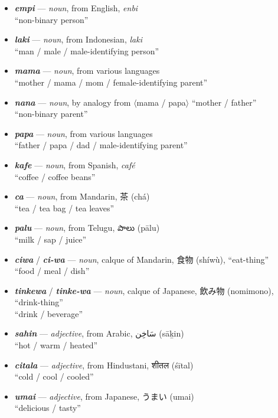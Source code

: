 \documentclass[a4paper]{article}
\begin{document}
\begin{itemize}
	\item \textbf{\textit{empi}} — \textit{noun}, from English, \textit{enbi} \\``non-binary person''
	\item \textbf{\textit{laki}} — \textit{noun}, from Indonesian, \textit{laki} \\``man / male / male-identifying person''
	\item \textbf{\textit{mama}} — \textit{noun}, from various languages \\``mother / mama / mom / female-identifying parent''
	\item \textbf{\textit{nana}} — \textit{noun}, by analogy from $\langle$mama / papa$\rangle$ ``mother / father'' \\``non-binary parent''
	\item \textbf{\textit{papa}} — \textit{noun}, from various languages \\``father / papa / dad / male-identifying parent''
	\item \textbf{\textit{kafe}} — \textit{noun}, from Spanish, \textit{café} \\``coffee / coffee beans''
	\item \textbf{\textit{ca}} — \textit{noun}, from Mandarin, 茶 (chá) \\``tea / tea bag / tea leaves''
	\item \textbf{\textit{palu}} — \textit{noun}, from Telugu, {\tlgfont పాలు} (pālu) \\``milk / sap / juice''
	\item \textbf{\textit{ciwa}} / \textbf{\textit{ci-wa}} — \textit{noun}, calque of Mandarin, 食物 (shíwù), ``eat-thing'' \\``food / meal / dish''
	\item \textbf{\textit{tinkewa}}  / \textbf{\textit{tinke-wa}} — \textit{noun}, calque of Japanese, 飲み物 (nomimono), ``drink-thing'' \\``drink / beverage''
	\item \textbf{\textit{sahin}} — \textit{adjective}, from Arabic, {\afont  سَاخِن } (sāḵin) \\``hot / warm / heated''
	\item \textbf{\textit{citala}} — \textit{adjective}, from Hindustani, {\hmfont शीतल} (śītal) \\``cold / cool / cooled''
	\item \textbf{\textit{umai}} — \textit{adjective}, from Japanese, うまい (umai) \\``delicious / tasty''

\end{itemize}
\end{document}
